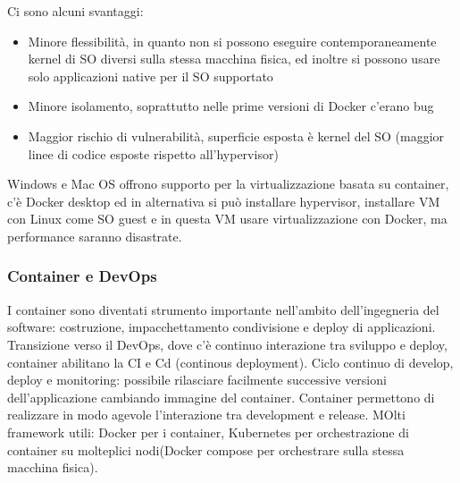 \documentclass{article}
\begin{document}
Ci sono alcuni svantaggi:
\begin{itemize}
\item Minore flessibilità, in quanto non si possono eseguire contemporaneamente kernel di SO diversi sulla stessa macchina fisica, ed inoltre si possono usare solo applicazioni native per il SO supportato
\item Minore isolamento, soprattutto nelle prime versioni di Docker c'erano bug 
\item Maggior rischio di vulnerabilità, superficie esposta è kernel del SO (maggior linee di codice esposte rispetto all'hypervisor)
\end{itemize}
Windows e Mac OS offrono supporto per la virtualizzazione basata su container, c'è Docker desktop ed in alternativa si può installare hypervisor, installare VM con Linux come SO guest e in questa VM usare virtualizzazione con Docker, ma performance saranno disastrate.
\subsubsection{Container e DevOps}
I container sono diventati strumento importante nell'ambito dell'ingegneria del software: costruzione, impacchettamento condivisione e deploy di applicazioni. Transizione verso il DevOps, dove c'è continuo interazione tra sviluppo e deploy, container abilitano la CI e Cd (continous deployment). Ciclo continuo di develop, deploy e monitoring: possibile rilasciare facilmente successive versioni dell'applicazione cambiando immagine del container. Container permettono di realizzare in modo agevole l'interazione tra development e release. MOlti framework utili: Docker per i container, Kubernetes per orchestrazione di container su molteplici nodi(Docker compose per orchestrare sulla stessa macchina fisica).
\end{document}
